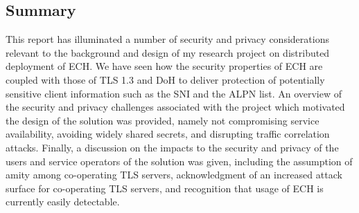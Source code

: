 \documentclass[a4paper,oneside,12pt]{article}
\begin{document}
\subsection*{Summary}

This report has illuminated a number of security and privacy considerations relevant to the background and design of my research project on distributed deployment of ECH. We have seen how the security properties of ECH are coupled with those of TLS 1.3 and DoH to deliver protection of potentially sensitive client information such as the SNI and the ALPN list. An overview of the security and privacy challenges associated with the project which motivated the design of the solution was provided, namely not compromising service availability, avoiding widely shared secrets, and disrupting traffic correlation attacks. Finally, a discussion on the impacts to the security and privacy of the users and service operators of the solution was given, including the assumption of amity among co-operating TLS servers, acknowledgment of an increased attack surface for co-operating TLS servers, and recognition that usage of ECH is currently easily detectable.

\printbibliography
\end{document}
